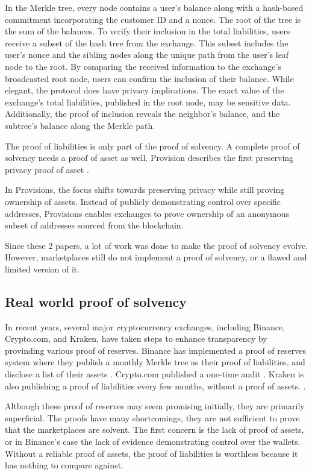In the Merkle tree, every node contains a user's balance along with a hash-based commitment incorporating the customer ID and a nonce. The root of the tree is the sum of the balances. 
To verify their inclusion in the total liabilities, users receive a subset of the hash tree from the exchange. This subset includes the user's nonce and the sibling nodes along the unique path from the user's leaf node to the root. 
By comparing the received information to the exchange's broadcasted root node, users can confirm the inclusion of their balance.
While elegant, the protocol does have privacy implications. The exact value of the exchange's total liabilities, published in the root node, may be sensitive data. 
Additionally, the proof of inclusion reveals the neighbor's balance, and the subtree's balance along the Merkle path. 

The proof of liabilities is only part of the proof of solvency. A complete proof of solvency needs a proof of asset as well.
Provision describes the first preserving privacy proof of asset \cite{DBBBCC15}.

In Provisions, the focus shifts towards preserving privacy while still proving ownership of assets. 
Instead of publicly demonstrating control over specific addresses, Provisions enables exchanges to prove ownership of an anonymous subset of addresses sourced from the blockchain.

Since these 2 papers, a lot of work was done to make the proof of solvency evolve. However, marketplaces still do not implement a proof of solvency, or a flawed and limited version of it.


\subsection{Real world proof of solvency} 
In recent years, several major cryptocurrency exchanges, including Binance, Crypto.com, and Kraken, have taken steps to enhance transparency by provinding various proof of reserves.
Binance has implemented a proof of reserves system where they publish a monthly Merkle tree as their proof of liabilities, and disclose a list of their assets \cite{BPR}. 
Crypto.com published a one-time audit \cite{CC22}. 
Kraken is also publishing a proof of liabilities every few months, without a proof of assets. \cite{KK23}.

Although these proof of reserves may seem promising initially, they are primarily superficial.
The proofs have many shortcomings, they are not sufficient to prove that the marketplaces are solvent.
The first concern is the lack of proof of assets, or in Binance's case the lack of evidence demonstrating control over the wallets.
Without a reliable proof of assets, the proof of liabilities is worthless because it has nothing to compare against.


